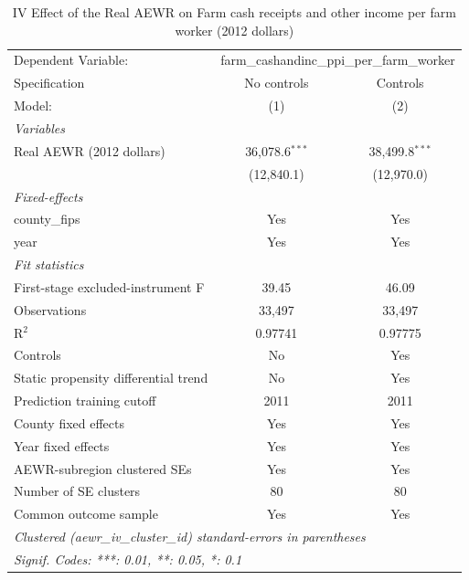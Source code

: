 
\begin{table}[htbp]
   \caption{\label{tab:iv_farm_income} IV Effect of the Real AEWR on Farm cash receipts and other income per farm worker (2012 dollars)}
   \centering
   \begin{tabular}{lcc}
      \tabularnewline \midrule \midrule
      Dependent Variable: & \multicolumn{2}{c}{farm\_cashandinc\_ppi\_per\_farm\_worker}\\
      Specification                        & No controls      & Controls \\
      Model:                               & (1)              & (2)\\
      \midrule
      \emph{Variables}\\
      Real AEWR (2012 dollars)             & 36,078.6$^{***}$ & 38,499.8$^{***}$\\
                                           & (12,840.1)       & (12,970.0)\\
      \midrule
      \emph{Fixed-effects}\\
      county\_fips                         & Yes              & Yes\\
      year                                 & Yes              & Yes\\
      \midrule
      \emph{Fit statistics}\\
      First-stage excluded-instrument F    & 39.45            & 46.09\\
      Observations                         & 33,497           & 33,497\\
      R$^2$                                & 0.97741          & 0.97775\\
      Controls                             & No               & Yes\\
      Static propensity differential trend & No               & Yes\\
      Prediction training cutoff           & 2011             & 2011\\
      County fixed effects                 & Yes              & Yes\\
      Year fixed effects                   & Yes              & Yes\\
      AEWR-subregion clustered SEs         & Yes              & Yes\\
      Number of SE clusters                & 80               & 80\\
      Common outcome sample                & Yes              & Yes\\
      \midrule \midrule
      \multicolumn{3}{l}{\emph{Clustered (aewr\_iv\_cluster\_id) standard-errors in parentheses}}\\
      \multicolumn{3}{l}{\emph{Signif. Codes: ***: 0.01, **: 0.05, *: 0.1}}\\
   \end{tabular}


\end{table}
